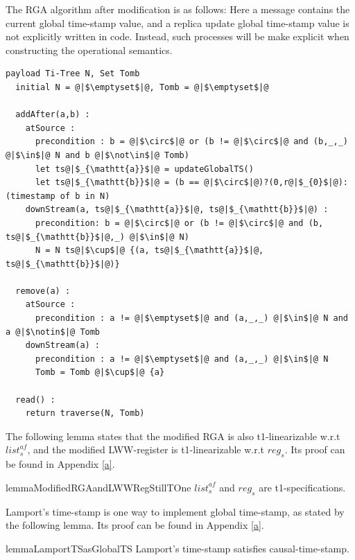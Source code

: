 The RGA algorithm after modification is as follows: Here a message contains the current global time-stamp value, and a replica update global time-stamp value is not explicitly written in code. Instead, such processes will be make explicit when constructing the operational semantics. 

\begin{lstlisting}[caption={Pseudo-code of the Modified RGA}, captionpos=b,label={lst:rga}]
  payload Ti-Tree N, Set Tomb
  initial N = @|$\emptyset$|@, Tomb = @|$\emptyset$|@

  addAfter(a,b) :
    atSource :
      precondition : b = @|$\circ$|@ or (b != @|$\circ$|@ and (b,_,_) @|$\in$|@ N and b @|$\not\in$|@ Tomb)
      let ts@|$_{\mathtt{a}}$|@ = updateGlobalTS() 
      let ts@|$_{\mathtt{b}}$|@ = (b == @|$\circ$|@)?(0,r@|$_{0}$|@):(timestamp of b in N)
    downStream(a, ts@|$_{\mathtt{a}}$|@, ts@|$_{\mathtt{b}}$|@) :
      precondition: b = @|$\circ$|@ or (b != @|$\circ$|@ and (b, ts@|$_{\mathtt{b}}$|@,_) @|$\in$|@ N)
      N = N ts@|$\cup$|@ {(a, ts@|$_{\mathtt{a}}$|@, ts@|$_{\mathtt{b}}$|@)}

  remove(a) :
    atSource :
      precondition : a != @|$\emptyset$|@ and (a,_,_) @|$\in$|@ N and a @|$\notin$|@ Tomb
    downStream(a) :
      precondition : a != @|$\emptyset$|@ and (a,_,_) @|$\in$|@ N
      Tomb = Tomb @|$\cup$|@ {a}

  read() :
    return traverse(N, Tomb)
\end{lstlisting} 


The following lemma states that the modified RGA is also t1-linearizable w.r.t $\mathit{list}_s^{\mathit{af}}$, and the modified LWW-register is t1-linearizable w.r.t $\mathit{reg}_s$. Its proof can be found in Appendix \ref{a}. 

\begin{restatable}{lemma}{ModifiedRGAandLWWRegStillTOne}
\label{lemma:modified RGA and LWW-register is still t1-linearizable}
$\mathit{list}_s^{\mathit{af}}$ and $\mathit{reg}_s$ are t1-specifications.
\end{restatable} 

Lamport's time-stamp is one way to implement global time-stamp, as stated by the following lemma. Its proof can be found in Appendix \ref{a}. 

\begin{restatable}{lemma}{LamportTSasGlobalTS}
\label{lemma:lamport time-stamp as global time-stamp}
Lamport's time-stamp satisfies causal-time-stamp. 
\end{restatable} 


